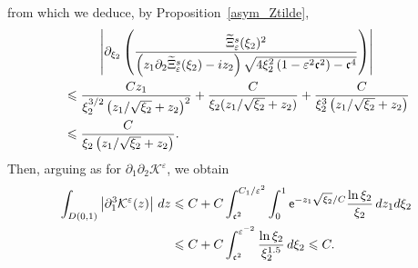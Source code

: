 \documentclass[AHL,Unicode,longabstracts,published]{cedram}
\newcommand*\p{\partial}
\newcommand*\BK{\mathcal{K}}
\newcommand*\ex{{\sf e}}
\newcommand*\cs{{\mathfrak c}}
\newcommand*\ls{\leqslant }
\newcommand*\e{\varepsilon}
\renewcommand*\t{\tilde}
\let\oldtilde\tilde
\renewcommand*{\tilde}[1]{\mathchoice{\widetilde{#1}}{\widetilde{#1}}{\oldtilde{#1}}{\oldtilde{#1}}}
\begin{document}
from which we deduce, by Proposition~\ref{asym_Ztilde},
\begin{multline*}
\left\lvert \p_{\xi_2}  \left(\frac{ \t\Xi_\e^s (\xi_2)^2}{\left(z_1 \p_2 \t\Xi_\e^s (\xi_2) - i z_2\right) \sqrt{4 \xi_2^2\left(1 - \e^2 \cs^2\right) - \cs^4}} \right) \right\rvert
\\
\begin{aligned}
&\ls \frac{ C z_1 }{ \xi_2^{3/2 } \left(z_1 / \sqrt{\xi_2 } + z_2\right)^2 } + \frac{ C}{ \xi_2 (z_1 / \sqrt{\xi_2 } + z_2) } + \frac{ C}{ \xi_2 ^3 \left(z_1 / \sqrt{\xi_2 } + z_2\right) }
\\ & \ls \frac{ C}{ \xi_2 \left(z_1 / \sqrt{\xi_2 } + z_2\right) }.
\end{aligned}
\end{multline*}
Then, arguing as for $ \p_1\p_2 \BK^\e $, we obtain
\begin{align*}
\int_{D(0,1)} \left\lvert \p_1^3 \BK^\e (z) \right\rvert \, dz & \ls C + C \int_{ \cs^2 }^{ C_1 / \e^{2} } \int_0^1 \ex^{- z_1 \sqrt{\xi_2}/C } \frac{\ln \xi_2 }{\xi_2} \, d z_1 d\xi_2
\\ & \ls C + C \int_{ \cs^2 }^{ \e^{-2} } \frac{\ln \xi_2}{ \xi_2^{1.5} } \, d \xi_2
\ls C.
\end{align*}
\end{document}
